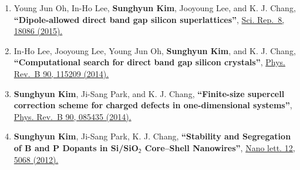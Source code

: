 \begin{enumerate}
{  efficient optical transition''},
  \href{http://journals.aps.org/prb/abstract/10.1103/PhysRevB.93.085201}{Phys.
  Rev.~B 93, 085201 (2016).}
\item
  Young Jun Oh, In-Ho Lee, \textbf{Sunghyun Kim}, Jooyoung Lee, and K.
  J. Chang, \textbf{``Dipole-allowed direct band gap silicon
  superlattices''}, \href{http://dx.doi.org/10.1038/srep18086}{Sci.
  Rep.~8, 18086 (2015).}
\item
  In-Ho Lee, Jooyoung Lee, Young Jun Oh, \textbf{Sunghyun Kim}, and K.
  J. Chang, \textbf{``Computational search for direct band gap silicon
  crystals''},
  \href{http://journals.aps.org/prb/abstract/10.1103/PhysRevB.90.115209}{Phys.
  Rev.~B 90, 115209 (2014).}
\item
  \textbf{Sunghyun Kim}, Ji-Sang Park, and K. J. Chang,
  \textbf{``Finite-size supercell correction scheme for charged defects
  in one-dimensional systems''},
  \href{http://journals.aps.org/prb/abstract/10.1103/PhysRevB.90.085435}{Phys.
  Rev.~B 90, 085435 (2014).}
\item
  \textbf{Sunghyun Kim}, Ji-Sang Park, K. J. Chang, \textbf{``Stability
  and Segregation of B and P Dopants in
  Si/SiO\(\boldsymbol{\mathsf{_2}}\) Core--Shell Nanowires''},
  \href{http://pubs.acs.org/doi/abs/10.1021/nl3013924}{Nano lett. 12,
  5068 (2012).}
\end{enumerate}
